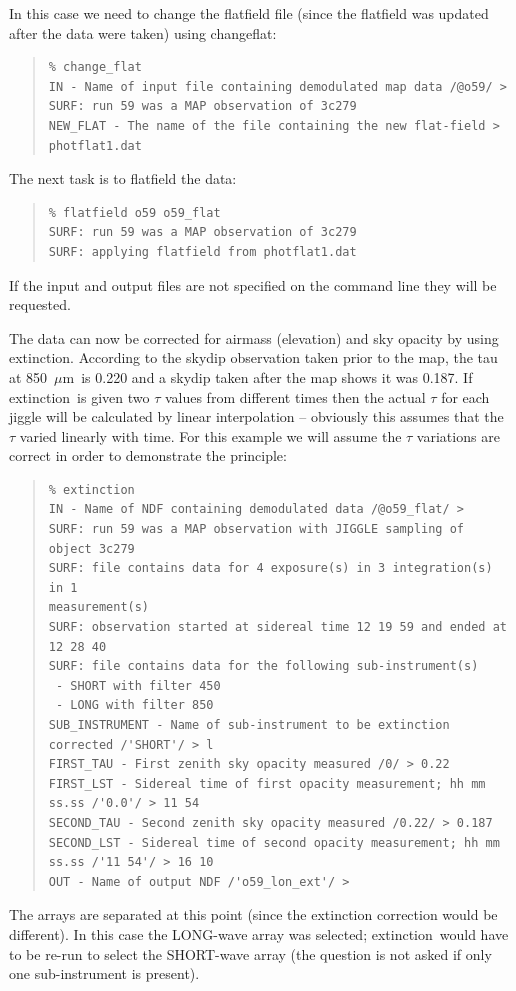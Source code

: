 \documentclass[twoside,11pt]{article}
\newcommand{\micron}           {$\mu$m}
\newcommand{\task}[1]{{\sf #1}}
\newcommand{\chgflat}{\htmlref{\task{change\_flat}}{CHANGE_FLAT}}
\newcommand{\ext}{\htmlref{\task{extinction}}{EXTINCTION}}
\newenvironment{myquote}{\begin{quote}\begin{small}}{\end{small}\end{quote}}
\newcommand{\htmlref}[2]{#1}
\renewcommand{\_}{\texttt{\symbol{95}}}
\begin{document}
In this case we need to change the flatfield file (since the flatfield was
updated after the data were taken) using \chgflat:
\begin{myquote}
\begin{verbatim}
% change_flat
IN - Name of input file containing demodulated map data /@o59/ > 
SURF: run 59 was a MAP observation of 3c279
NEW_FLAT - The name of the file containing the new flat-field > photflat1.dat
\end{verbatim}
\end{myquote}

The next task is to flatfield the data:
\begin{myquote}
\begin{verbatim}
% flatfield o59 o59_flat
SURF: run 59 was a MAP observation of 3c279
SURF: applying flatfield from photflat1.dat
\end{verbatim}
\end{myquote}

If the input and output files are not specified on the command line they will
be requested.

The data can now be corrected for airmass (elevation) and sky opacity by using
\ext. According to the skydip observation taken prior to the map, the tau at
850~\micron\ is 0.220 and a skydip taken after the map shows it was 0.187. If
\ext\ is given two $\tau$ values from different times then the actual $\tau$
for each jiggle will be calculated by linear interpolation -- obviously this
assumes that the $\tau$ varied linearly with time. For this example we will
assume the $\tau$ variations are correct in order to demonstrate the principle:

\begin{myquote}
\begin{verbatim}
% extinction
IN - Name of NDF containing demodulated data /@o59_flat/ > 
SURF: run 59 was a MAP observation with JIGGLE sampling of object 3c279
SURF: file contains data for 4 exposure(s) in 3 integration(s) in 1
measurement(s)
SURF: observation started at sidereal time 12 19 59 and ended at 12 28 40
SURF: file contains data for the following sub-instrument(s)
 - SHORT with filter 450
 - LONG with filter 850
SUB_INSTRUMENT - Name of sub-instrument to be extinction corrected /'SHORT'/ > l
FIRST_TAU - First zenith sky opacity measured /0/ > 0.22
FIRST_LST - Sidereal time of first opacity measurement; hh mm ss.ss /'0.0'/ > 11 54
SECOND_TAU - Second zenith sky opacity measured /0.22/ > 0.187
SECOND_LST - Sidereal time of second opacity measurement; hh mm ss.ss /'11 54'/ > 16 10
OUT - Name of output NDF /'o59_lon_ext'/ > 
\end{verbatim}
\end{myquote}
The arrays are separated at this point (since the extinction correction would
be different). In this case the LONG-wave array was selected; \ext\
would have to be re-run to select the SHORT-wave array (the question is not
asked if only one sub-instrument is present). 
\end{document}
